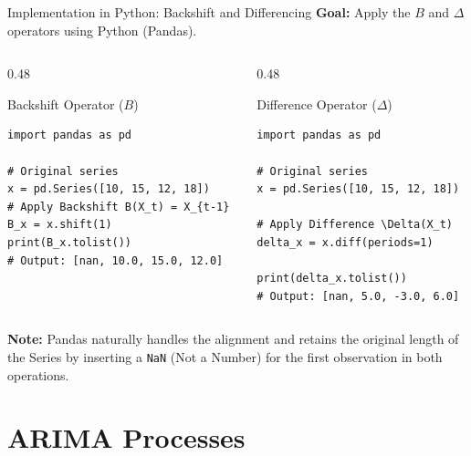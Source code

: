 \documentclass[aspectratio=169]{beamer}
\begin{document}
\begin{frame}[fragile]{Implementation in Python: Backshift and Differencing}
\small
\textbf{Goal:} Apply the $B$ and $\Delta$ operators using Python (Pandas).
\begin{columns}[T]
\begin{column}{0.48\textwidth}
\begin{block}{Backshift Operator ($B$)}
\begin{verbatim}
import pandas as pd

# Original series
x = pd.Series([10, 15, 12, 18])
# Apply Backshift B(X_t) = X_{t-1}
B_x = x.shift(1)
print(B_x.tolist())
# Output: [nan, 10.0, 15.0, 12.0]
\end{verbatim}
\end{block}
\end{column}

\begin{column}{0.48\textwidth}
\begin{block}{Difference Operator ($\Delta$)}
\begin{verbatim}
import pandas as pd

# Original series
x = pd.Series([10, 15, 12, 18])

# Apply Difference \Delta(X_t)
delta_x = x.diff(periods=1)

print(delta_x.tolist())
# Output: [nan, 5.0, -3.0, 6.0]
\end{verbatim}
\end{block}
\end{column}
\end{columns}

\vspace{0.3cm}
\textbf{Note:} Pandas naturally handles the alignment and retains the original length of the Series by inserting a \texttt{NaN} (Not a Number) for the first observation in both operations.
\end{frame}

\section{ARIMA Processes}
\end{document}
